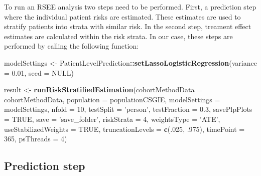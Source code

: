 \documentclass[]{article}
\newenvironment{Shaded}{\begin{snugshade}}{\end{snugshade}}
\newcommand{\DataTypeTok}[1]{\textcolor[rgb]{0.13,0.29,0.53}{#1}}
\newcommand{\DecValTok}[1]{\textcolor[rgb]{0.00,0.00,0.81}{#1}}
\newcommand{\FloatTok}[1]{\textcolor[rgb]{0.00,0.00,0.81}{#1}}
\newcommand{\KeywordTok}[1]{\textcolor[rgb]{0.13,0.29,0.53}{\textbf{#1}}}
\newcommand{\NormalTok}[1]{#1}
\newcommand{\OperatorTok}[1]{\textcolor[rgb]{0.81,0.36,0.00}{\textbf{#1}}}
\newcommand{\OtherTok}[1]{\textcolor[rgb]{0.56,0.35,0.01}{#1}}
\newcommand{\StringTok}[1]{\textcolor[rgb]{0.31,0.60,0.02}{#1}}
\begin{document}
To run an RSEE analysis two steps need to be performed. First, a
prediction step where the individual patient risks are estimated. These
estimates are used to stratify patients into strata with similar risk.
In the second step, treament effect estimates are calculated within the
risk strata. In our case, these steps are performed by calling the
following function:

\begin{Shaded}
\begin{Highlighting}[]
\NormalTok{modelSettings <-}
\StringTok{  }\NormalTok{PatientLevelPrediction}\OperatorTok{::}\KeywordTok{setLassoLogisticRegression}\NormalTok{(}\DataTypeTok{variance =} \FloatTok{0.01}\NormalTok{,}
                                                     \DataTypeTok{seed =} \OtherTok{NULL}\NormalTok{)}

\NormalTok{result <-}\StringTok{ }\KeywordTok{runRiskStratifiedEstimation}\NormalTok{(}\DataTypeTok{cohortMethodData =}\NormalTok{ cohortMethodData, }
                                      \DataTypeTok{population =}\NormalTok{ populationCSGIE, }
                                      \DataTypeTok{modelSettings =}\NormalTok{ modelSettings,}
                                      \DataTypeTok{nfold =} \DecValTok{10}\NormalTok{,}
                                      \DataTypeTok{testSplit =} \StringTok{'person'}\NormalTok{,}
                                      \DataTypeTok{testFraction =} \FloatTok{0.3}\NormalTok{,}
                                      \DataTypeTok{savePlpPlots =} \OtherTok{TRUE}\NormalTok{,}
                                      \DataTypeTok{save =} \StringTok{'save_folder'}\NormalTok{,}
                                      \DataTypeTok{riskStrata =} \DecValTok{4}\NormalTok{,}
                                      \DataTypeTok{weightsType =} \StringTok{'ATE'}\NormalTok{,}
                                      \DataTypeTok{useStabilizedWeights =} \OtherTok{TRUE}\NormalTok{,}
                                      \DataTypeTok{truncationLevels =} \KeywordTok{c}\NormalTok{(.}\DecValTok{025}\NormalTok{, }\FloatTok{.975}\NormalTok{),}
                                      \DataTypeTok{timePoint =} \DecValTok{365}\NormalTok{,}
                                      \DataTypeTok{psThreads =} \DecValTok{4}\NormalTok{)}
\end{Highlighting}
\end{Shaded}

\hypertarget{prediction-step}{%
\subsection{Prediction step}\label{prediction-step}}
\end{document}

